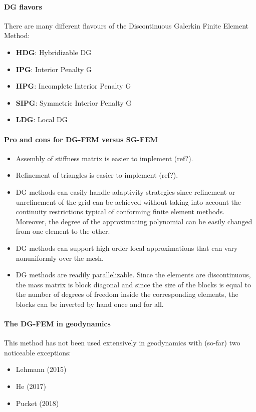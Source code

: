 \paragraph{DG flavors}
There are many different flavours of the Discontinuous Galerkin Finite Element Method:
\begin{itemize}
\item {\bf HDG}: Hybridizable DG \cite{cogo09,conp10,ngpc10,ngpc11,ngpe12}
\item {\bf IPG}: Interior Penalty G  \cite{mofh08,mofp10}
\item {\bf IIPG}: Incomplete Interior Penalty G  \cite{dole08}
\item {\bf SIPG}: Symmetric Interior Penalty G  \cite{bodi11,sclu17a}
\item {\bf LDG}: Local DG \cite{cacp02,coks02,cacs05,coks05}  
\end{itemize}

\paragraph{Pro and cons for DG-FEM versus SG-FEM}

\begin{itemize}
\item Assembly of stiffness matrix is easier to implement (ref?).
\item Refinement of triangles is easier to implement (ref?). 
\item DG methods can easily handle adaptivity strategies since refinement or
unrefinement of the grid can be achieved without taking into account
the continuity restrictions typical of conforming finite element methods. 
Moreover, the degree of the approximating polynomial can be easily
changed from one element to the other. \cite{coks00}
\item DG methods can support high order local approximations that can vary nonuniformly over the mesh.
\item DG methods are readily parallelizable. Since the elements are discontinuous, 
the mass matrix is block diagonal and since the size of the blocks
is equal to the number of degrees of freedom inside the corresponding
elements, the blocks can be inverted by hand once and for all.\cite{coks00}
\end{itemize}

\paragraph{The DG-FEM in geodynamics} 
This method has not been used extensively in geodynamics with (so-far) two 
noticeable exceptions:

\begin{itemize}
\item Lehmann \etal (2015) \cite{lelk15} 
\item He \etal (2017) \cite{hepb17}
\item Pucket \etal (2018) \cite{puth18}
\end{itemize}


